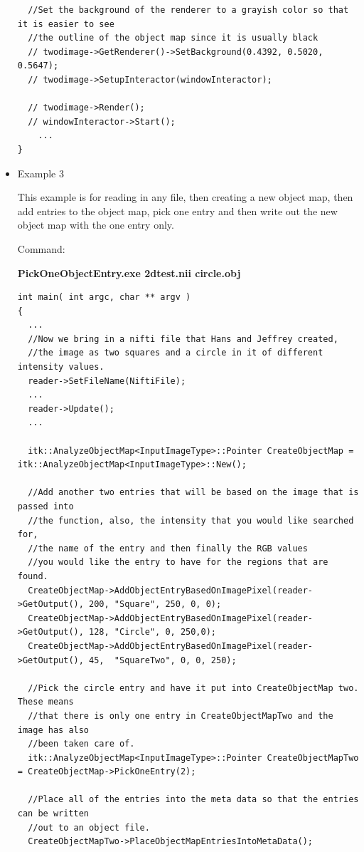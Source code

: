 \documentclass{InsightArticle}
\begin{document}
\begin{itemize}
\begin{verbatim}
  //Set the background of the renderer to a grayish color so that it is easier to see
  //the outline of the object map since it is usually black
  // twodimage->GetRenderer()->SetBackground(0.4392, 0.5020, 0.5647);
  // twodimage->SetupInteractor(windowInteractor);
   
  // twodimage->Render();
  // windowInteractor->Start();
	...
}
\end{verbatim} \normalsize
                                                                               
\item Example 3

This example is for reading in any file, then creating a new object map, then add entries to the object map, pick one entry and then write out the new object map with the one entry only.

Command:

\textbf{PickOneObjectEntry.exe 2dtest.nii circle.obj}

\small \begin{verbatim}
int main( int argc, char ** argv )
{
  ...
  //Now we bring in a nifti file that Hans and Jeffrey created, 
  //the image as two squares and a circle in it of different intensity values.
  reader->SetFileName(NiftiFile);
  ...
  reader->Update();
  ...
  
  itk::AnalyzeObjectMap<InputImageType>::Pointer CreateObjectMap = itk::AnalyzeObjectMap<InputImageType>::New();
  
  //Add another two entries that will be based on the image that is passed into 
  //the function, also, the intensity that you would like searched for, 
  //the name of the entry and then finally the RGB values
  //you would like the entry to have for the regions that are found.
  CreateObjectMap->AddObjectEntryBasedOnImagePixel(reader->GetOutput(), 200, "Square", 250, 0, 0);
  CreateObjectMap->AddObjectEntryBasedOnImagePixel(reader->GetOutput(), 128, "Circle", 0, 250,0);
  CreateObjectMap->AddObjectEntryBasedOnImagePixel(reader->GetOutput(), 45,  "SquareTwo", 0, 0, 250);
  
  //Pick the circle entry and have it put into CreateObjectMap two.  These means
  //that there is only one entry in CreateObjectMapTwo and the image has also
  //been taken care of.
  itk::AnalyzeObjectMap<InputImageType>::Pointer CreateObjectMapTwo = CreateObjectMap->PickOneEntry(2);
  
  //Place all of the entries into the meta data so that the entries can be written
  //out to an object file.
  CreateObjectMapTwo->PlaceObjectMapEntriesIntoMetaData();
  

\end{verbatim}
\end{itemize}
\end{document}
